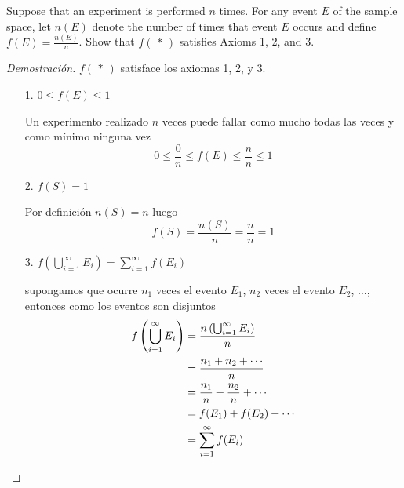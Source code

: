 \item Suppose that an experiment is performed $n$ times. For any event $E$ of the sample space, let $n(E)$ denote the number of times that event $E$ occurs and define $f(E) = \tfrac{n(E)}{n}$. Show that $f(\,*\,)$ satisfies Axioms 1, 2, and 3.

\begin{proof}[Demostración] $f(\,*\,)$ satisface los axiomas 1, 2, y 3.
    \begin{enumerate}
        \item[1.] $0 \le f(E) \le 1$
        
        Un experimento realizado $n$ veces puede fallar como mucho todas las veces y como mínimo ninguna vez
        \[ 0 \le \frac{0}{n} \le f(E) \le \frac{n}{n} \le 1 \]
        \item[2.] $f(S) = 1$ 

        Por definición $n(S) = n$ luego
        \[ f(S) = \frac{n(S)}{n} = \frac{n}{n} = 1 \]
        \item[3.] $f\left ( \bigcup_{i=1}^\infty E_i \right ) = \sum_{i=1}^\infty f(E_i)$ 

        supongamos que ocurre $n_1$ veces el evento $E_1$, $n_2$ veces el evento $E_2$, $\dots$, entonces como los eventos son disjuntos
        \begin{align*}
            f\left ( \bigcup_{i=1}^\infty E_i \right ) &= \frac{n\left ( \bigcup_{i=1}^\infty E_i \right )}{n}\\
            &= \frac{n_1 + n_2 + \cdots}{n}\\
            &= \frac{n_1}{n}  + \frac{n_2}{n} + \cdots\\
            &= f(E_1) + f(E_2) + \cdots\\
            &= \sum_{i=1}^\infty f(E_i) \qedhere
        \end{align*}
    \end{enumerate}
\end{proof}